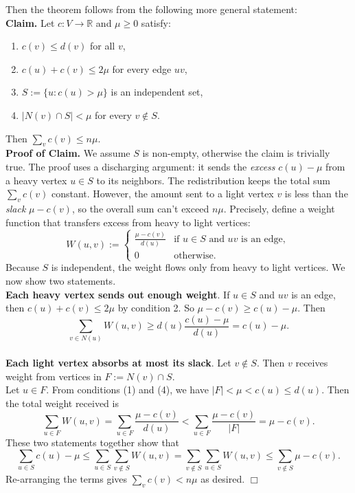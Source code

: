Then the theorem follows from the following more general statement:
\\
\textbf{Claim.} Let $c: V \rightarrow \mathbb{R}$ and $\mu \geq 0$ satisfy:
\begin{enumerate}
\item $c(v) \leq d(v)$ for all $v$,
\item $c(u) + c(v) \leq 2\mu$ for every edge $uv$,
\item $S := \{u: c(u) > \mu\}$ is an independent set,
\item $|N(v) \cap S| < \mu$ for every $v \notin S$.
\end{enumerate}
Then $\sum_v c(v) \leq n\mu$.
\\
\textbf{Proof of Claim.} We assume $S$ is non-empty, otherwise the claim is trivially true. The proof uses a discharging argument: it sends the \textit{excess} $c(u) - \mu$ from a heavy vertex $u \in S$ to its neighbors. The redistribution keeps the total sum $\sum_v c(v)$ constant. However, the amount sent to a light vertex $v$ is less than the \textit{slack} $\mu - c(v)$, so the overall sum can't exceed $n\mu$.
Precisely, define a weight function that transfers excess from heavy to light vertices:
$$W(u, v) := \begin{cases}
\frac{\mu - c(v)}{d(u)} & \textrm{if $u \in S$ and $uv$ is an edge},\\
0 & \textrm{otherwise}.
\end{cases}$$
Because $S$ is independent, the weight flows only from heavy to light vertices. We now show two statements.
\\
\textbf{Each heavy vertex sends out enough weight}. If $u \in S$ and $uv$ is an edge, then $c(u) + c(v) \leq 2\mu$ by condition 2. So $\mu - c(v) \geq c(u) - \mu$. Then
$$\sum_{v \in N(u)} W(u, v) \geq d(u) \frac{c(u) - \mu}{d(u)} = c(u) - \mu.$$
\\
\textbf{Each light vertex absorbs at most its slack}. Let $v \notin S$. Then $v$ receives weight from vertices in $F := N(v) \cap S$.
\\
Let $u \in F$. From conditions (1) and (4), we have $|F| < \mu < c(u) \leq d(u)$. Then the total weight received is
$$\sum_{u \in F} W(u, v) = \sum_{u \in F} \frac{\mu - c(v)}{d(u)} < \sum_{u \in F} \frac{\mu - c(v)}{|F|} = \mu - c(v). 
$$
These two statements together show that
$$
\sum_{u \in S} c(u) - \mu \leq \sum_{u \in S} \sum_{v \notin S} W(u, v) = \sum_{v \notin S} \sum_{u \in S} W(u, v) \leq \sum_{v \notin S} \mu - c(v).
$$
Re-arranging the terms gives $\sum_v c(v) < n\mu$ as desired. \hfill $\Box$
